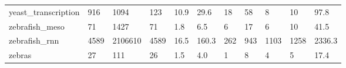 \begin{longtable}{lllllllllll}
 yeast\_transcription                                & 916        & 1094      & 123   & 10.9   & 29.6   & 18    & 58     & 8      & 10     & 97.8    \\
 zebrafish\_meso                                     & 71         & 1427      & 71    & 1.8    & 6.5    & 6     & 17     & 6      & 10     & 41.5    \\
 zebrafish\_rnn                                      & 4589       & 2106610   & 4589  & 16.5   & 160.3  & 262   & 943    & 1103   & 1258   & 2336.3  \\
 zebras                                             & 27         & 111       & 26    & 1.5    & 4.0    & 1     & 8      & 4      & 5      & 17.4    \\
\hline
\end{longtable}